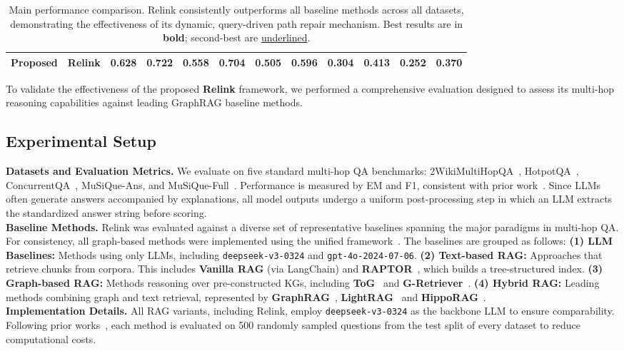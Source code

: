 \documentclass[letterpaper]{article} %
\begin{document}
\begin{table}[!htbp]
\begin{tabular}{cccccccccccc}
 
\midrule
\rowcolor{gray!20}
\textbf{Proposed} & \textbf{Relink} 
& \textbf{0.628} & \textbf{0.722} 
& \textbf{0.558} & \textbf{0.704}
& \textbf{0.505} & \textbf{0.596} 
& \textbf{0.304} & \textbf{0.413}
& \textbf{0.252} & \textbf{0.370} 
 \\
\bottomrule
\end{tabular}
\caption{Main performance comparison. Relink consistently outperforms all baseline methods across all datasets, demonstrating the effectiveness of its dynamic, query-driven path repair mechanism. Best results are in \textbf{bold}; second-best are \underline{underlined}.}
\label{tab:main_result}
\vspace{-1em}
\end{table}

To validate the effectiveness of the proposed \textbf{Relink} framework, we performed a comprehensive evaluation designed to assess its multi-hop reasoning capabilities against leading GraphRAG baseline methods.

\subsection{Experimental Setup}

\textbf{Datasets and Evaluation Metrics.}
We evaluate on five standard multi-hop QA benchmarks: 2WikiMultiHopQA~\cite{2WikiMultiHopQA}, HotpotQA~\cite{HotpotQA}, ConcurrentQA~\cite{ConcurrentQA}, MuSiQue-Ans, and MuSiQue-Full~\cite{musique}. Performance is measured by EM and F1, consistent with prior work~\cite{HOLMES,TCR-QF}. Since LLMs often generate answers accompanied by explanations, all model outputs undergo a uniform post-processing step in which an LLM extracts the standardized answer string before scoring.
\\ \noindent\textbf{Baseline Methods.}
Relink was evaluated against a diverse set of representative baselines spanning the major paradigms in multi-hop QA. For consistency, all graph-based methods were implemented using the unified framework~\cite{In-depth}. The baselines are grouped as follows:
\textbf{(1) LLM Baselines:} Methods using only LLMs, including \texttt{deepseek-v3-0324} and \texttt{gpt-4o-2024-07-06}.
\textbf{(2) Text-based RAG:} Approaches that retrieve chunks from corpora. This includes \textbf{Vanilla RAG} (via LangChain) and \textbf{RAPTOR}~\cite{RAPTOR}, which builds a tree-structured index.
\textbf{(3) Graph-based RAG:} Methods reasoning over pre-constructed KGs, including \textbf{ToG}~\cite{Think-on-Graph} and \textbf{G-Retriever}~\cite{G-Retriever}.
\textbf{(4) Hybrid RAG:} Leading methods combining graph and text retrieval, represented by \textbf{GraphRAG}~\cite{GraphRAG}, \textbf{LightRAG}~\cite{LightRAG} and \textbf{HippoRAG}~\cite{HippoRAG}.
\\ \noindent\textbf{Implementation Details.}
All RAG variants, including Relink, employ \texttt{deepseek-v3-0324} as the backbone LLM to ensure comparability. Following prior works~\cite{HOLMES,TCR-QF}, each method is evaluated on 500 randomly sampled questions from the test split of every dataset to reduce computational costs. 
%
%
%
\end{document}
